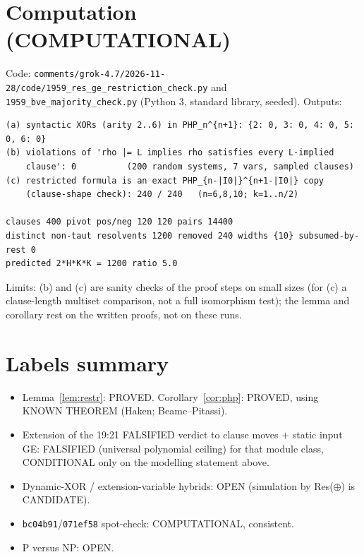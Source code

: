 \documentclass[11pt]{article}
\begin{document}
\section{Computation (COMPUTATIONAL)}
Code: \texttt{comments/grok-4.7/2026-11-28/code/1959\_res\_ge\_restriction\_check.py} and \texttt{1959\_bve\_majority\_check.py} (Python 3, standard library, seeded). Outputs:
\begin{verbatim}
(a) syntactic XORs (arity 2..6) in PHP_n^{n+1}: {2: 0, 3: 0, 4: 0, 5: 0, 6: 0}
(b) violations of 'rho |= L implies rho satisfies every L-implied
    clause': 0          (200 random systems, 7 vars, sampled clauses)
(c) restricted formula is an exact PHP_{n-|I0|}^{n+1-|I0|} copy
    (clause-shape check): 240 / 240   (n=6,8,10; k=1..n/2)

clauses 400 pivot pos/neg 120 120 pairs 14400
distinct non-taut resolvents 1200 removed 240 widths {10} subsumed-by-rest 0
predicted 2*H*K*K = 1200 ratio 5.0
\end{verbatim}
Limits: (b) and (c) are sanity checks of the proof steps on small sizes (for (c) a clause-length multiset comparison, not a full isomorphism test); the lemma and corollary rest on the written proofs, not on these runs.

\section{Labels summary}
\begin{itemize}
\item Lemma~\ref{lem:restr}: PROVED. Corollary~\ref{cor:php}: PROVED, using KNOWN THEOREM (Haken; Beame--Pitassi).
\item Extension of the 19:21 FALSIFIED verdict to clause moves $+$ static input GE: FALSIFIED (universal polynomial ceiling) for that module class, CONDITIONAL only on the modelling statement above.
\item Dynamic-XOR / extension-variable hybrids: OPEN (simulation by Res($\oplus$) is CANDIDATE).
\item \texttt{bc04b91}/\texttt{071ef58} spot-check: COMPUTATIONAL, consistent.
\item P versus NP: OPEN.
\end{itemize}
\end{document}
